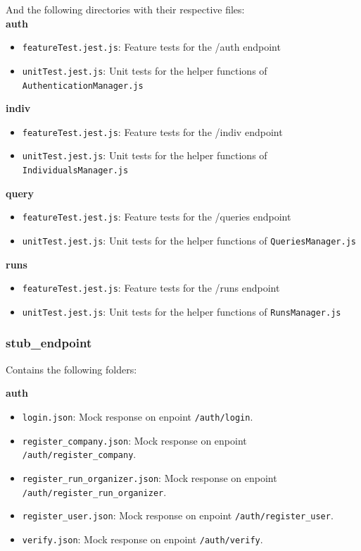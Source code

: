 \noindent And the following directories with their respective files: \\
\noindent \textbf{auth}
\begin{itemize}
    \item \texttt{featureTest.jest.js}: Feature tests for the /auth endpoint
    \item \texttt{unitTest.jest.js}: Unit tests for the helper functions of \texttt{AuthenticationManager.js}
\end{itemize}
\noindent \textbf{indiv}
\begin{itemize}
    \item \texttt{featureTest.jest.js}: Feature tests for the /indiv endpoint
    \item \texttt{unitTest.jest.js}: Unit tests for the helper functions of \texttt{IndividualsManager.js}
\end{itemize}
\noindent \textbf{query}
\begin{itemize}
    \item \texttt{featureTest.jest.js}: Feature tests for the /queries endpoint
    \item \texttt{unitTest.jest.js}: Unit tests for the helper functions of \texttt{QueriesManager.js}
\end{itemize}
\noindent \textbf{runs}
\begin{itemize}
    \item \texttt{featureTest.jest.js}: Feature tests for the /runs endpoint
    \item \texttt{unitTest.jest.js}: Unit tests for the helper functions of \texttt{RunsManager.js}

\end{itemize}


\subsubsection{stub\_endpoint}
Contains the following folders: 

\noindent \textbf{auth}
\begin{itemize}
    \item \texttt{login.json}: Mock response on enpoint \texttt{/auth/login}.
    \item \texttt{register\_company.json}: Mock response on enpoint \texttt{/auth/register\_company}.
    \item \texttt{register\_run\_organizer.json}: Mock response on enpoint \texttt{/auth/register\_run\_organizer}.
    \item \texttt{register\_user.json}: Mock response on enpoint \texttt{/auth/register\_user}.
    \item \texttt{verify.json}: Mock response on enpoint \texttt{/auth/verify}.

\end{itemize}

